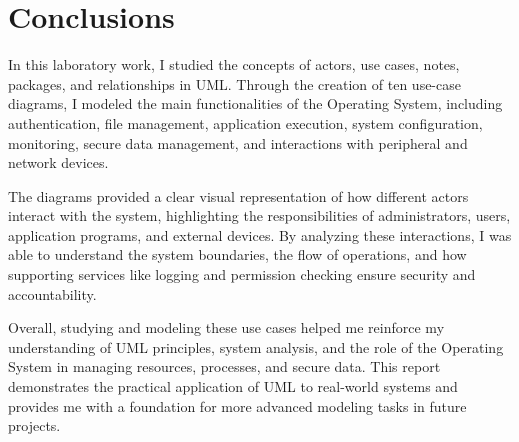 \chapter*{Conclusions}

In this laboratory work, I studied the concepts of actors, use cases, notes, packages, and relationships in UML. Through the creation of ten use-case diagrams, I modeled the main functionalities of the Operating System, including authentication, file management, application execution, system configuration, monitoring, secure data management, and interactions with peripheral and network devices.

The diagrams provided a clear visual representation of how different actors interact with the system, highlighting the responsibilities of administrators, users, application programs, and external devices. By analyzing these interactions, I was able to understand the system boundaries, the flow of operations, and how supporting services like logging and permission checking ensure security and accountability.

Overall, studying and modeling these use cases helped me reinforce my understanding of UML principles, system analysis, and the role of the Operating System in managing resources, processes, and secure data. This report demonstrates the practical application of UML to real-world systems and provides me with a foundation for more advanced modeling tasks in future projects.